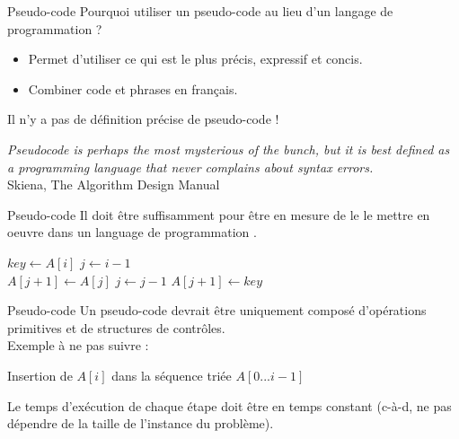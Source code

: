 \documentclass[handout]{beamer}
\let\emph\relax %
\begin{document}
\begin{frame}[t]{Pseudo-code}
    Pourquoi utiliser un pseudo-code au lieu d'un langage de programmation ?
    \begin{itemize}
        \item Permet d'utiliser ce qui est le plus précis, expressif et concis.
        \item Combiner code et phrases en français. 
    \end{itemize}
    Il n'y a pas de définition précise de pseudo-code !

    \begin{flushright}
        \textit{Pseudocode is perhaps the most mysterious of the bunch, but it is best defined as a
        programming language that never complains about syntax errors.}\\
        Skiena, The Algorithm Design Manual
    \end{flushright}
\end{frame}

\begin{frame}[fragile]{Pseudo-code}
Il doit être suffisamment \emph{clair} pour être en mesure de le le mettre en oeuvre dans un language de programmation \emph{sans ambiguïté}.

\begin{algorithmic}
        \State $key \leftarrow A[i]$
        \State $j \leftarrow i - 1$\\
            \State $A[j + 1] \leftarrow A[j]$
            \State $j \leftarrow j - 1$
        \EndWhile 
        \State $A[j + 1] \leftarrow key$
    \EndFor
    \EndFunction
\end{algorithmic}

\end{frame}

\begin{frame}[fragile]{Pseudo-code}
Un pseudo-code devrait être uniquement composé d'opérations primitives et de structures de contrôles.\\
\vfill
Exemple à ne pas suivre :
\vfill
\begin{algorithmic}
        \State Insertion de $A[i]$ dans la séquence triée $A[0...i-1]$
    \EndFor
    \EndFunction
\end{algorithmic}

Le temps d'exécution de chaque étape doit être en temps constant (c-à-d, ne pas dépendre de la taille de l'instance du problème).
\end{frame}
\end{document}
